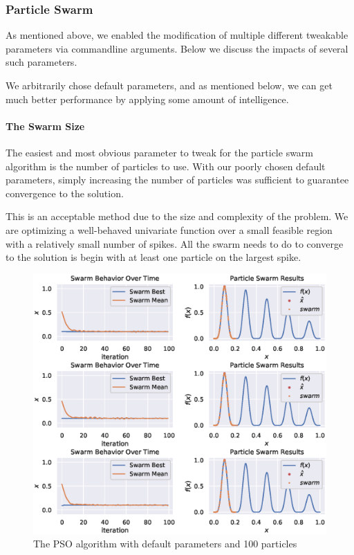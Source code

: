 \documentclass[12pt]{article}
\begin{document}
\subsubsection{Particle Swarm}
As mentioned above, we enabled the modification of multiple different tweakable parameters via commandline arguments.
Below we discuss the impacts of several such parameters.

We arbitrarily chose default parameters, and as mentioned below, we can get much better performance by applying some amount of intelligence.

\paragraph{The Swarm Size} The easiest and most obvious parameter to tweak for the particle swarm algorithm is the number of particles to use.
With our poorly chosen default parameters, simply increasing the number of particles was sufficient to guarantee convergence to the solution.

This is an acceptable method due to the size and complexity of the problem.
We are optimizing a well-behaved univariate function over a small feasible region with a relatively small number of spikes.
All the swarm needs to do to converge to the solution is begin with at least one particle on the largest spike.

\begin{figure}[H]
    \centering
    \includegraphics[width=\textwidth]{figures/pso-100-particles.eps}
    \caption{The PSO algorithm with default parameters and 100 particles}\label{fig:pso:100-particles}
\end{figure}
\end{document}
